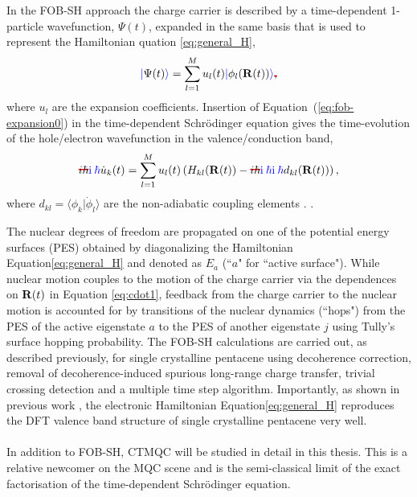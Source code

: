 \\\\
In the FOB-SH approach the charge carrier is described by a time-dependent 1-particle wavefunction, $\Psi(t)$,
expanded in the same basis that is used to represent the Hamiltonian quation \eqref{eq:general_H},
\begin{equation}
	\madd{|}\Psi(t)\madd{\rangle}  = \sum\limits_{l=1}^{M} u_l (t) \madd{|}\phi_{l} ({\bf R}(t))\madd{\rangle}\mremove{,} \label{eq:fob-expansion0}
\end{equation}
where $u_l$ are the expansion coefficients. Insertion of Equation~(\ref{eq:fob-expansion0}) in the
time-dependent Schr\"{o}dinger equation gives the time-evolution of the hole/electron wavefunction in the
valence/conduction band,
\begin{equation}
	\mremove{i \hbar}\madd{\im \: \hbar}\dot{u}_{k}(t) = \sum\limits_{l=1}^{M}{u}_{l}(t)\left({H}_{kl}({\bf R}(t)) - \mremove{i \hbar}\madd{\im \: \hbar} \madd{\im \: \hbar} d_{kl}({\bf R}(t)) \right) \label{eq:cdot1},
\end{equation}
where $d_{kl} \!=\! \langle \phi_k \vert \dot{\phi}_l \rangle$ are the non-adiabatic coupling elements . \cite{Carof2017FSSH_inline, FOB-SH_Spencer_inline}.

The nuclear degrees of freedom are propagated on one of the potential energy surfaces (PES) obtained by diagonalizing the
Hamiltonian Equation\eqref{eq:general_H} and denoted as $E_a$ (``$a$" for ``active surface"). While nuclear motion
couples to the motion of the charge carrier via the dependences on ${\bf R}(t)$ in Equation \eqref{eq:cdot1}, feedback
from the charge carrier to the nuclear motion is accounted for by transitions of the nuclear dynamics (``hops") from
the PES of the active eigenstate $a$ to the PES of another eigenstate $j$ using Tully's surface hopping probability.\cite{FSSH_orig}
The FOB-SH calculations are carried out, as described previously, for single crystalline pentacene\cite{Giannini2020} using  decoherence correction, removal of decoherence-induced spurious long-range charge transfer, trivial crossing detection
and a multiple time step algorithm. Importantly, as shown in previous work \cite{gajdos_ultrafast_2014}, the electronic Hamiltonian Equation\eqref{eq:general_H}
reproduces the DFT valence band structure of single crystalline pentacene\cite{Giannini2020} very well.
\\\\
In addition to FOB-SH, CTMQC will be studied in detail in this thesis. This is a relative newcomer on the MQC scene and is the semi-classical limit of the exact factorisation of the time-dependent Schr\"odinger equation.

